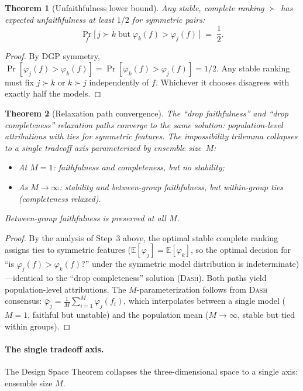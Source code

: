 \documentclass{article}
\newtheorem{theorem}{Theorem}
\newcommand{\E}{\mathbb{E}}
\newcommand{\DASH}{\textsc{Dash}}
\begin{document}
\begin{theorem}[Unfaithfulness lower bound]
\label{thm:unfaithfulness-bound}
Any stable, complete ranking $\succ$ has expected unfaithfulness at least $1/2$ for symmetric pairs:
\[
    \Pr_f\bigl[\, j \succ k \;\text{but}\; \varphi_k(f) > \varphi_j(f) \,\bigr] \;=\; \frac{1}{2}.
\]
\end{theorem}

\begin{proof}
By DGP symmetry, $\Pr[\varphi_j(f) > \varphi_k(f)] = \Pr[\varphi_k(f) > \varphi_j(f)] = 1/2$. Any stable ranking must fix $j \succ k$ or $k \succ j$ independently of $f$. Whichever it chooses disagrees with exactly half the models.
\end{proof}

\begin{theorem}[Relaxation path convergence]
\label{thm:path-convergence}
The ``drop faithfulness'' and ``drop completeness'' relaxation paths converge to the same solution: population-level attributions with ties for symmetric features. The impossibility trilemma collapses to a single tradeoff axis parameterized by ensemble size~$M$:
\begin{itemize}
    \item At $M = 1$: faithfulness and completeness, but no stability;
    \item As $M \to \infty$: stability and between-group faithfulness, but within-group ties (completeness relaxed).
\end{itemize}
Between-group faithfulness is preserved at all $M$.
\end{theorem}

\begin{proof}
By the analysis of Step~3 above, the optimal stable complete ranking assigns ties to symmetric features ($\E[\varphi_j] = \E[\varphi_k]$, so the optimal decision for ``is $\varphi_j(f) > \varphi_k(f)$?'' under the symmetric model distribution is indeterminate)---identical to the ``drop completeness'' solution (\DASH{}). Both paths yield population-level attributions. The $M$-parameterization follows from \DASH{} consensus: $\bar\varphi_j = \frac{1}{M}\sum_{i=1}^M \varphi_j(f_i)$, which interpolates between a single model ($M=1$, faithful but unstable) and the population mean ($M \to \infty$, stable but tied within groups).
\end{proof}

\paragraph{The single tradeoff axis.}
The Design Space Theorem collapses the three-dimensional space to a single axis: ensemble size $M$.
\end{document}

